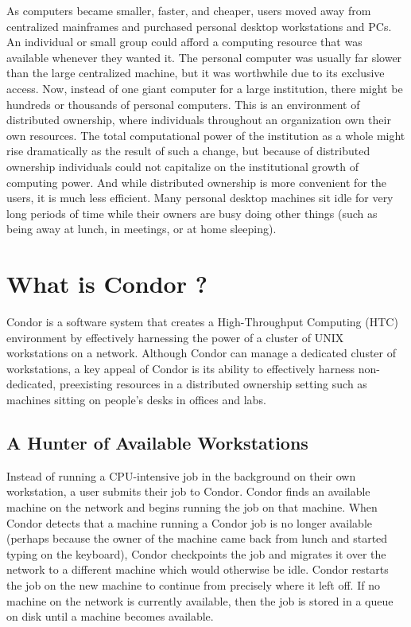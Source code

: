 As computers became smaller, faster, and cheaper, users moved
away from centralized mainframes and purchased personal desktop
workstations and PCs. An individual or small group could afford a
computing resource that was available whenever they wanted it. The
personal computer was
usually far slower than the large centralized machine, but it
was worthwhile due to its
exclusive access.
Now, instead of one giant
computer for a large institution, there might be hundreds or thousands
of personal computers. This is an environment of distributed ownership,
where individuals throughout an organization own their own resources.
The total computational power of the institution as a whole might rise
dramatically as the result of such a change, but because of distributed
ownership individuals could not capitalize on the institutional growth of
computing power. And while distributed ownership is more convenient for
the users, it is much less efficient. Many personal desktop
machines sit idle for very long periods of time while their owners are
busy doing other things (such as being away at lunch, in meetings,
or at home sleeping). 

\section{\label{sec:what-is-condor}What is Condor ?}

Condor is a software system that creates a High-Throughput Computing
(HTC) environment by effectively harnessing the power of a cluster of
UNIX workstations on a network. Although Condor can manage a dedicated
cluster of workstations, a key appeal of Condor is its ability to
effectively harness non-dedicated, preexisting resources in a
distributed ownership 
setting such as machines sitting on people's desks
in offices and labs. 

\subsection{A Hunter of Available Workstations}

Instead of running a CPU-intensive job in the background on their own
workstation, a user submits their job to Condor. Condor finds an
available machine on the network and begins running the job on
that machine. When Condor detects that a machine running a Condor job
is no longer available (perhaps because the owner of the machine
came back from lunch and started typing on the keyboard), Condor
checkpoints 
the job and migrates 
it over the network to a
different machine which would otherwise be idle. Condor restarts
the job on the new machine to continue from precisely where it left off.
If no
machine on the network is currently available, then the job is stored in
a queue on disk until a machine becomes available.

